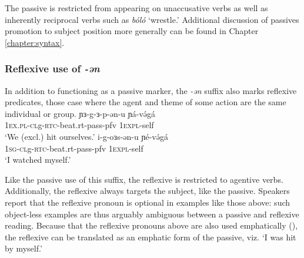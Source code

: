 The passive is restricted from appearing on unaccusative verbs as well as inherently reciprocal verbs such as \textit{bóló} `wrestle.' Additional discussion of passives promotion to subject position more generally can be found in Chapter \ref{chapter:syntax}.

%
%

\subsubsection{Reflexive use of \textit{-ən}}

In addition to functioning as a passive marker, the \textit{-ən} suffix also marks reflexive predicates, those case where the agent and theme of some action are the same individual or group.
\ea
\ea 	\gll ɲɜ-g-ɜ-p-ən-u ɲá-və́gá \\
			1\textsc{ex}.\textsc{pl}-\textsc{cl}g-\textsc{rtc}-beat.rt-pass-pfv 1\textsc{expl}-self\\
		\glt	`We (excl.) hit ourselves.'
\ex		\gll i-g-oɜs-ən-u ɲé-və́gá \\
			1\textsc{sg}-\textsc{cl}g-\textsc{rtc}-beat.rt-pass-pfv 1\textsc{expl}-self\\
		\glt	`I watched myself.'
\z 
\z 

Like the passive use of this suffix, the reflexive is restricted to agentive verbs. Additionally, the reflexive always targets the subject, like the passive. Speakers report that the reflexive pronoun is optional in examples like those above: such object-less examples are thus arguably ambiguous between a passive and reflexive reading. Because that the reflexive pronouns above are also used emphatically (), the reflexive can be translated as an emphatic form of the passive, viz. `I was hit by myself.'

